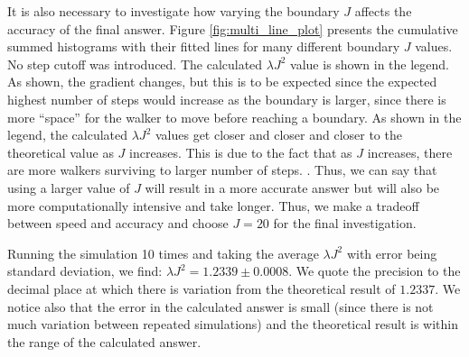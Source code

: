 \documentclass[journal]{IEEEtran}
\begin{document}
It is also necessary to investigate how varying the boundary $J$ affects the
accuracy of the final answer. Figure \ref{fig:multi_line_plot} presents the
cumulative summed histograms with their fitted lines for many different boundary
$J$ values. No step cutoff was introduced. The calculated $\lambda J^2$ value is
shown in the legend.  As shown, the gradient changes, but
this is to be expected since the expected highest number of steps would increase
as the boundary is larger, since there is more ``space'' for the walker to move
before reaching a boundary. As shown in the legend, the calculated $\lambda J^2$
values get closer and closer and closer to the theoretical value as $J$
increases. This is due to the fact that as $J$ increases, there are more walkers
surviving to larger number of steps. .
Thus, we can say that using a larger value of $J$ will result in a more
accurate answer but will also be more computationally intensive and take
longer. Thus, we make a tradeoff between speed and accuracy and choose $J=20$
for the final investigation.

Running the simulation 10 times and taking the average $\lambda J^2$ with error
being standard deviation, we find: $\lambda J^2 = 1.2339 \pm 0.0008$. We quote
the precision to the decimal place at which there is variation from the
theoretical result of $1.2337$. We notice also that the error in the calculated
answer is small (since there is not much variation between repeated simulations)
and the theoretical result is within the range of the calculated answer.
\end{document}
